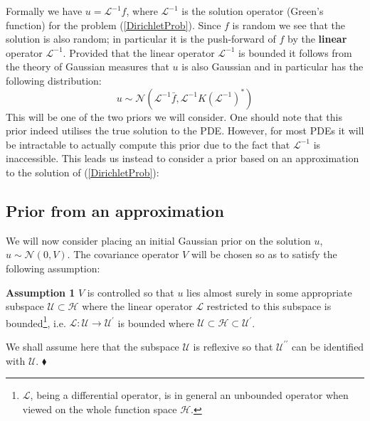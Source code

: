 Formally we have $u=\mathcal{L}^{-1}f$, where $\mathcal{L}^{-1}$ is the solution operator (Green's function) for the problem (\ref{DirichletProb}). Since $f$ is random we see that the solution is also random; in particular it is the push-forward of $f$ by the \textbf{linear} operator $\mathcal{L}^{-1}$. Provided that the linear operator $\mathcal{L}^{-1}$ is bounded it follows from the theory of Gaussian measures \textcolor{blue}{\citep[see Proposition 1.18]{da2006introduction}} that $u$ is also Gaussian and in particular has the following distribution:
\begin{equation}
    \label{true_prior}
    u\sim\mathcal{N}(\mathcal{L}^{-1}\bar{f},\mathcal{L}^{-1}K(\mathcal{L}^{-1})^{*})
\end{equation}
This will be one of the two priors we will consider. One should note that this prior indeed utilises the true solution to the PDE. However, for most PDEs it will be intractable to actually compute this prior due to the fact that $\mathcal{L}^{-1}$ is inaccessible. This leads us instead to consider a prior based on an approximation to the solution of (\ref{DirichletProb}):

\subsection{Prior from an approximation}

We will now consider placing an initial Gaussian prior on the solution $u$, $u\sim\mathcal{N}(0,V)$. The covariance operator $V$ will be chosen so as to satisfy the following assumption:

\noindent \textbf{Assumption 1} $V$ is controlled so that $u$ lies almost surely in some appropriate subspace $\mathcal{U}\subset\mathcal{H}$ where the linear operator $\mathcal{L}$ restricted to this subspace is bounded\footnote{$\mathcal{L}$, being a differential operator, is in general an unbounded operator when viewed on the whole function space $\mathcal{H}$.}, i.e. $\mathcal{L}:\mathcal{U}\rightarrow\mathcal{U}^{\prime}$ is bounded where $\mathcal{U}\subset\mathcal{H}\subset{\mathcal{U}^{\prime}}$.
\vspace{5pt}

\begin{remark}
    We shall assume here that the subspace $\mathcal{U}$ is reflexive so that $\mathcal{U}^{\prime\prime}$ can be identified with $\mathcal{U}$.
    $\mathbin{\blacklozenge}$
\end{remark}

